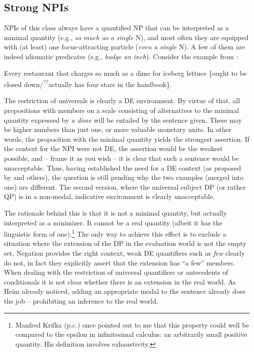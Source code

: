 \documentclass[output=paper,colorlinks,citecolor=brown,
]{langscibook}
\begin{document}
\subsection{Strong NPIs}

NPIs of this class always have a quantified NP that can be interpreted as a minimal quantity (e.g.,
\textit{so much as a single} N), and most often they are equipped with (at least) one
focus-attracting particle (\textit{even a single} N). A few of them are indeed idiomatic predicates
(e.g., \textit{budge an inch}). Consider the example from \citet[104]{heim1984}:

\ea \label{neubarthex:everyrestaurant}
\glt Every restaurant that charges so much as a dime for iceberg lettuce \{ought to be closed down\slash\textsuperscript{??}actually has four stars in the
     handbook\}.
\z


The restriction of universals is clearly a DE environment. By virtue of that, all propositions with members on a scale
consisting of alternatives to the minimal quantity expressed by \textit{a dime} will be entailed by the sentence given.
These may be higher numbers than just one, or more valuable monetary units. In other words, the proposition with the
minimal quantity yields the strongest assertion. If the context for the NPI were not DE, the assertion would be the
weakest possible, and -- frame it as you wish -- it is clear that such a sentence would be unacceptable. Thus, having
established the need for a DE context (as proposed by \citealt{ladusaw1979} and others), the question is still
pending why the two examples (merged into one) are different. The second version, where the universal subject DP (or rather QP) is in a non-modal, indicative environment is clearly unacceptable.

The rationale behind this is that it is not a minimal quantity, but actually interpreted as a minimizer. It cannot be a real
quantity (albeit it has the linguistic form of one).\footnote{Manfred Krifka (p.c.) once pointed out to me that this
property could well be compared to the epsilon in infinitesimal calculus: an arbitrarily small positive quantity. His
definition \citep[in][]{krifka1995} involves exhaustivity.} The only way to achieve this effect is to exclude a situation
where the extension of the DP in the evaluation world is not the empty set. Negation provides the right context, weak
DE quantifiers such as \textit{few} clearly do not, in fact they explicitly assert that the extension has ``a few''
members. When dealing with the restriction of universal quantifiers or antecedents of conditionals it is not clear
whether there is an extension in the real world. As Heim already noticed, adding an appropriate modal to the sentence
already does the job -- prohibiting an inference to the real world.
\end{document}

